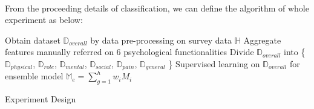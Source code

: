 \documentclass[runningheads]{llncs}
\begin{document}
\paragraph{}
From the proceeding details of classification, we can define the algorithm of whole experiment as below: \\
\IncMargin{1em}
\begin{algorithm}[H]
\BlankLine
Obtain dataset $\mathbb{D}_{overall}$ by data pre-processing on survey data $\mathbb{H}$\;
Aggregate features manually referred on 6 psychological functionalities \;
Divide $\mathbb{D}_{overall}$ into \{$\mathbb{D}_{physical}$, $\mathbb{D}_{role}$, $\mathbb{D}_{mental}$, $\mathbb{D}_{social}$, $\mathbb{D}_{pain}$, $\mathbb{D}_{general}$ \}\;
Supervised learning on $\mathbb{D}_{overall}$ for ensemble model $\mathbb{M}_{e} = \sum_{g = 1}^{h} w_{i} M_{i} $\;
\caption{Experiment Design}\label{experiment}
\end{algorithm}\DecMargin{1em}
%
%
\end{document}
